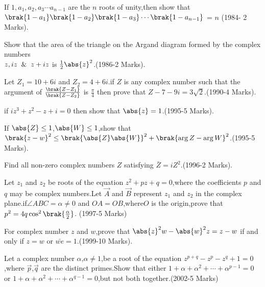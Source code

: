 \iffalse
    \title{Assignment}
    \author{Shreyansh Sonkar - ai24btech11032}
    \section{subjective}
  \fi
\item If $1,a_{1},a_{2},a_{3}\cdots a_{n-1}$ are the $n$ roots of unity,then show that $\brak{1-a_1}\brak{1-a_2}\brak{1-a_3}\cdots \brak{1-a_{n-1}}$ = $n$ \hfill (1984- 2 Marks).\\
\item Show that the area of the triangle on the Argand diagram formed by the complex numbers\\
$z,iz \And z+iz$ is $\frac{1}{2}\abs{z}^{2}$.\hfill (1986-2 Marks).\\
\item Let $Z_{1}=10+6i$ and $Z_{2}=4+6i$.if $Z$ is any complex number such that the argument of ${\frac{\brak{Z-Z_1}}{\brak{Z-Z_2}}}$ is ${\frac{\pi}{4}}$ then prove that $Z-7-9i=3\sqrt{2}$.\hfill(1990-4 Marks).\\
\item if {$iz^{3}+z^2-z+i=0$} then show that $\abs{z}=1$.\hfill(1995-5 Marks).\\
\item If $\abs{Z}\le1$,$\abs{W}\le1$,show that $\brak{z-w}^{2}\le\brak{\abs{Z}\abs{W}}^{2}+\brak{\arg Z-\arg W}^2$.\hfill(1995-5 Marks). \\
\item Find all non-zero complex numbers $Z$ satisfying $\bar Z=iZ^{2}$.\hfill(1996-2 Marks).\\
\item Let $z_{1}$ and $z_{2}$ be roots of the equation $z^{2}+pz+q=0$,where the coefficients $p$ and $q$ may be complex numbers.Let $\Vec{A}$ and $\Vec{B}$ represent $z_{1}$ and $z_{2}$ in the complex plane.if$\angle ABC=\alpha\not=0$ and $OA=OB$,where$O$ is the origin,prove that $p^{2}=4q\cos^{2}\brak{\frac{\alpha}{2}}$. \hfill(1997-5 Marks)\\
\item For complex number $z$ and $w$,prove that $\abs{z}^{2}w-\abs{w}^{2}z=z-w$ if and only if $z=w$ or $\bar{we}=1$.\hfill(1999-10 Marks).\\
\item Let a complex number $\alpha$,$\alpha \not=1$,be a root of the equation $z^{p+q}-z^p-z^q+1=0$,where $\Vec{p}$,$\Vec{q}$ are the distinct primes.Show that either $1+\alpha+\alpha^{2}+\cdots+\alpha^{p-1}=0$ or $1+\alpha+\alpha^{2}+\cdots+\alpha^{q- 1}=0$,but not both together.\hfill(2002-5 Marks)\\
